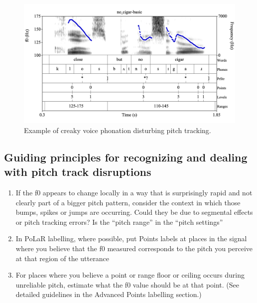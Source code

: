 \documentclass[11pt, twoside]{memoir}
\begin{document}
\begin{figure}[H]
\centering
%
\includegraphics[width=.875\linewidth]{Levels-no_cigar-basic.png}
%
\caption{Example of creaky voice phonation disturbing pitch tracking.%
\label{fig:no_cigar f0-tracking}%
%
}
\end{figure}


\subsection{Guiding principles for recognizing and dealing with pitch track disruptions}\label{sec:guiding-principles-for-recognizing-and-dealing-with-pitch-track-disruptions}

\begin{enumerate} \def\labelenumi{\arabic{enumi}.}
\item If the f0 appears to change locally in a way that is surprisingly rapid and not clearly part of a bigger pitch pattern, consider the context in which those bumps, spikes or jumps are occurring. Could they be due to segmental effects or pitch tracking errors? Is the “pitch range” in the “pitch settings”
\item In PoLaR labelling, where possible, put Points labels at places in the signal where you believe that the f0 measured corresponds to the pitch you perceive at that region of the utterance
\item For places where you believe a point or range floor or ceiling occurs during unreliable pitch, estimate what the f0 value should be at that point. (See detailed guidelines in the Advanced Points labelling section.) 
\end{enumerate}






\end{document}
